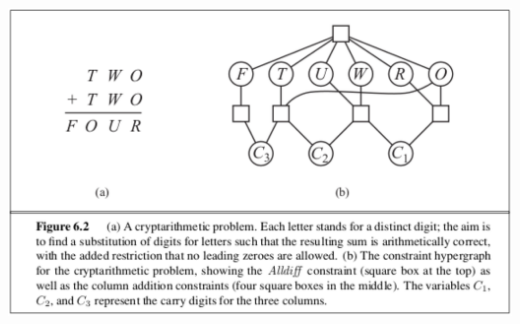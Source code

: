 \documentclass{article}
\begin{document}
\begin{enumerate}
\begin{center}
    \includegraphics[scale=0.5]{472-PS5-Q2.png}
\end{center}


\end{enumerate}
\end{document}
